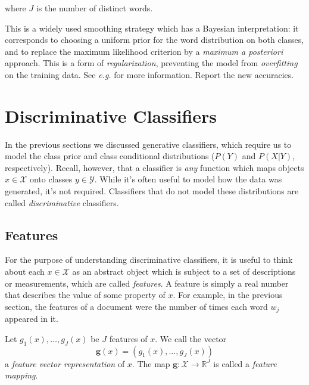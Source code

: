 \begin{exercise}
\begin{enumerate}
where $J$ is the number of distinct words. 

This is a widely used smoothing strategy which has a Bayesian interpretation: it corresponds to choosing a uniform prior 
for the word distribution on both classes, and to replace the maximum likelihood criterion by a \emph{maximum a posteriori} approach. 
This is a form of \emph{regularization}, preventing the model from \emph{overfitting} on the training data. 
See \emph{e.g.} \citet{Manning1999,Manning2008} for more information. 
Report the new accuracies. 
\end{enumerate}
\end{exercise}

\section{Discriminative Classifiers}\label{sec:linearclass}

In the previous sections we discussed generative classifiers, which require us to model the class prior and class conditional distributions ($P(Y)$ and $P(X|Y)$, respectively). Recall, however, that a classifier is \emph{any} function which maps objects $x \in \mathcal{X}$ onto classes $y \in \mathcal{Y}$. While it's often useful to model how the data was generated, it's not required. Classifiers that do not model these distributions are called \emph{discriminative} classifiers. 

\subsection{Features}

For the purpose of understanding discriminative classifiers, it is useful to think about each  $x \in \mathcal{X}$ as an abstract object which is subject to a set of descriptions or measurements, which are called \emph{features}. A feature is simply a real number that describes the value of some property of $x$. For example, in the previous section, the features of a document were the number of times each word $w_j$ appeared in it.

Let $g_1(x),\ldots,g_J(x)$ be $J$ features of $x$. We call the vector
\begin{equation}
\boldsymbol{g}(x) = (g_1(x),\ldots,g_J(x))
\end{equation} 
a \emph{feature vector representation} of $x$. 
The map $\boldsymbol{g}:\mathcal{X}\rightarrow \mathbb{R}^J$ is called a \emph{feature mapping}. 

